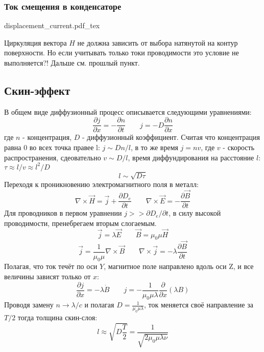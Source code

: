 \documentclass{article}
\newcommand{\incfig}[2][1]{%
    \def\svgwidth{#1\columnwidth}
    {#2.pdf_tex}
}
\begin{document}
\subsubsection{Ток смещения в конденсаторе}
\incfig{displacement_current}
Циркуляция вектора $H$ не должна зависить от выбора натянутой на контур поверхности. Но если учитывать только токи проводимости это условие не выполняется?!
Дальше см. прошлый пункт.
\subsection{Скин-эффект}
В общем виде диффузионный процесс описывается следующими уравнениями:
\[\frac{\partial j}{\partial x}=-\frac{\partial n}{\partial t} \qquad j=-D\frac{\partial n}{\partial x}\]
где $n$ - концентрация, $D$ - диффузионный коэффициент.
Считая что концентрация равна 0 во всех точка правее l:
$j \sim Dn/l$, в то же время $j=nv$, где $v$ - скорость распространения, сдеовательно $v\sim D/l$,
время диффундирования на расстояние $l$: $\tau\approx l/v \approx l^2/D$
\[l \sim \sqrt{D\tau}\]
Переходя к проникновению электромагнитного поля в металл:
\[\nabla \times \vec{H} = \vec{j} + \frac{\partial D_{e}}{\partial t} \qquad \nabla \times \vec{E}=-\frac{\partial \vec{B}}{\partial t}\]
Для проводников в первом уравнении $j >> \partial D_{e}/\partial t$, в силу высокой проводимости, пренебрегаем вторым слогаемым.
\[\vec{j}=\lambda\vec{E} \qquad \vec{B}=\mu_0\mu\vec{H}\]
\[\vec{j}=\frac{1}{\mu_{0}\mu}\nabla \times \vec{B} \qquad \nabla \times \vec{j} = -\lambda\frac{\partial \vec{B}}{\partial t}\]
Полагая, что ток течёт по оси $Y$, магнитное поле направлено вдоль оси Z, и все величины зависят только от $x$:
\[\frac{\partial j}{\partial x}=-\lambda \dot B \qquad j=-\frac{1}{\mu_{0}\mu\lambda}\frac{\partial}{\partial x}(\lambda B)\]
Проводя замену $n\to\lambda/c$ и полагая $D=\frac{1}{\mu_{0}\mu\lambda}$, ток меняется своё направление за $T/2$ тогда толщина скин-слоя:
\[l\approx\sqrt{D\frac{T}{2}}=\frac{1}{\sqrt{2\mu_0\mu\lambda\nu}}\]
\end{document}
